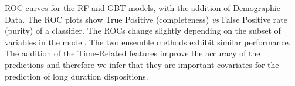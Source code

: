 ROC curves for the RF and GBT models, with the addition of Demographic Data. The ROC plots show True Positive (completeness) {\it vs} False Positive rate (purity) of a classifier. The ROCs change slightly depending on the subset of variables in the model. The two ensemble methods exhibit similar performance. The addition of the Time-Related features improve the accuracy of the predictions and therefore we infer that they are important covariates for the prediction of long duration dispositions.
\label{fig:demoROC}